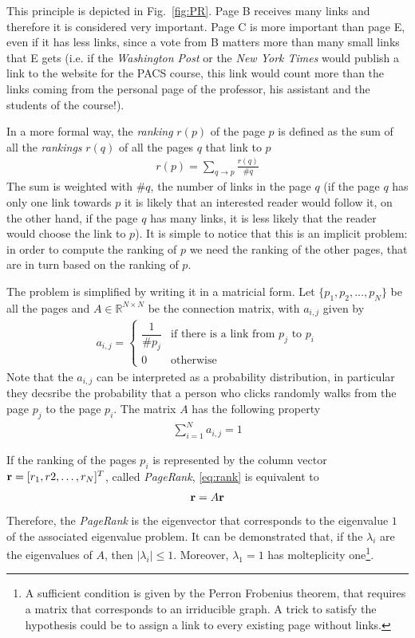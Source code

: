 This principle is depicted in Fig.~\ref{fig:PR}. Page B receives many links and
therefore it is considered very important. Page C is more important than page E,
even if it has less links, since a vote from B matters more than many small
links that E gets (i.e. if the \emph{Washington Post} or the
\emph{New York Times} would publish a link to the website for the PACS course,
this link would count more than the links coming from the personal page of the
professor, his assistant and the students of the course!).

In a more formal way, the \emph{ranking} $r(p)$ of the page $p$ is defined as
the sum of all the \emph{rankings} $r(q)$ of all the pages $q$ that link to $p$
\begin{align}
    \label{eq:rank}
    r(p)=\sum_{q \rightarrow p} \frac{r(q)}{\#q}
\end{align}
The sum is weighted with $\#q$, the number of links in the page $q$ (if the page
$q$ has only one link towards $p$ it is likely that an interested reader would
follow it, on the other hand, if the page $q$ has many links, it is less likely
that the reader would choose the link to $p$).
It is simple to notice that this is an implicit problem: in order to compute the
ranking of $p$ we need the ranking of the other pages, that are in turn based on
the ranking of $p$.

The problem is simplified by writing it in a matricial form. Let $\{p_1, p_2,
\dots, p_N\}$ be all the pages and $A \in \mathbb{R}^{N \times N}$ be the
connection matrix, with $a_{i,j}$ given by
\begin{align}
      \label{eq:harmonicp}
      a_{i,j}=
      \begin{cases}
        \dfrac{1}{\#p_j} & \text{if there is a link from $p_j$ to $p_i$} \\[1ex]
        0 &  \mbox{otherwise}
      \end{cases}
\end{align}
Note that the $a_{i,j}$ can be interpreted as a probability distribution, in
particular they decsribe the probability that a person who clicks randomly
walks from the page $p_j$ to the page $p_i$. The matrix $A$ has the following
property
\begin{align} \label{eq:sum1}
    \sum_{i=1}^{N} a_{i,j}=1
\end{align}

If the ranking of the pages $p_i$ is represented by the column vector $\mathbf{r} =
[r_1, r2, \dots, r_N]^T$, called \emph{PageRank}, \eqref{eq:rank} is equivalent
to
\begin{align*}
    \mathbf{r}=A \mathbf{r}
\end{align*}
Therefore, the \emph{PageRank} is the eigenvector that corresponds to the
eigenvalue $1$ of the associated eigenvalue problem. It can be demonstrated
that, if the $\lambda_i$ are the eigenvalues of $A$, then $|\lambda_i| \leq 1$.
Moreover, $\lambda_1=1$ has molteplicity one\footnote{A sufficient condition is
given by the Perron Frobenius theorem, that requires a matrix that corresponds
to an irriducible graph. A trick to satisfy the hypothesis could be to assign
a link to every existing page without links.}.

